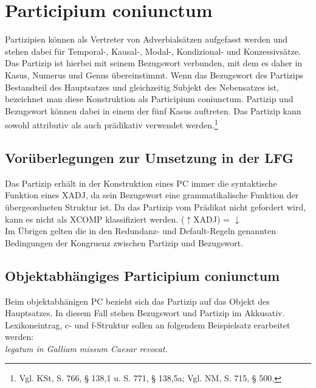 \documentclass[12pt,a4paper]{article}
\begin{document}
\section{Participium coniunctum}
Partizipien können als Vertreter von Adverbialsätzen aufgefasst werden und stehen dabei für Temporal-, Kausal-, Modal-, Kondizional- und Konzessivsätze. Das Partizip ist hierbei mit seinem Bezugswort verbunden, mit dem es daher in Kasus, Numerus und Genus übereinstimmt. Wenn das Bezugswort des Partizips Bestandteil des Hauptsatzes und gleichzeitig Subjekt des Nebensatzes ist, bezeichnet man diese Konstruktion als Participium coniunctum. Partizip und Bezugswort können dabei in einem der fünf Kasus  auftreten. Das Partizip kann sowohl attributiv als auch prädikativ verwendet werden.\footnote{Vgl. KSt, S. 766, § 138,1 u. S. 771, § 138,5a; Vgl. NM, S. 715, § 500.} \\

\subsection{Vorüberlegungen zur Umsetzung in der LFG}
Das Partizip erhält in der Konstruktion eines PC immer die syntaktische Funktion eines XADJ, da sein Bezugswort eine grammatikalische Funktion der übergeordneten Struktur ist. Da das Partizip vom Prädikat nicht gefordert wird, kann es nicht als XCOMP klassifiziert werden.
($\uparrow$XADJ) = $\downarrow$ \\
Im Übrigen gelten die in den Redundanz- und Default-Regeln genannten Bedingungen der Kongruenz zwischen Partizip und Bezugswort.


\subsection{Objektabhängiges Participium coniunctum}
Beim objektabhänigen PC bezieht sich das Partizip auf das Objekt des Hauptsatzes. In diesem Fall stehen Bezugswort und Partizip im Akkusativ. \\
Lexikoneintrag, c- und f-Struktur sollen an folgendem Beispielsatz erarbeitet werden: \\
\textit{legatum in Galliam missum Caesar revocat.}
\end{document}

